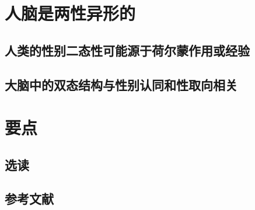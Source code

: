 \section{人脑是两性异形的}
\subsection{人类的性别二态性可能源于荷尔蒙作用或经验}
\subsection{大脑中的双态结构与性别认同和性取向相关}

\section{要点}
\subsection{选读}
\subsection{参考文献}
